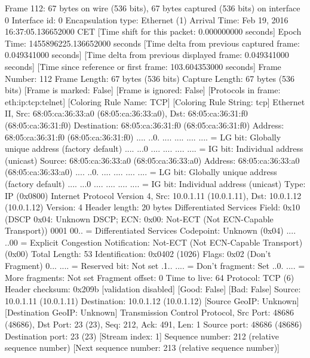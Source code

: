Frame 112: 67 bytes on wire (536 bits), 67 bytes captured (536 bits) on interface 0
    Interface id: 0
    Encapsulation type: Ethernet (1)
    Arrival Time: Feb 19, 2016 16:37:05.136652000 CET
    [Time shift for this packet: 0.000000000 seconds]
    Epoch Time: 1455896225.136652000 seconds
    [Time delta from previous captured frame: 0.049341000 seconds]
    [Time delta from previous displayed frame: 0.049341000 seconds]
    [Time since reference or first frame: 103.604353000 seconds]
    Frame Number: 112
    Frame Length: 67 bytes (536 bits)
    Capture Length: 67 bytes (536 bits)
    [Frame is marked: False]
    [Frame is ignored: False]
    [Protocols in frame: eth:ip:tcp:telnet]
    [Coloring Rule Name: TCP]
    [Coloring Rule String: tcp]
Ethernet II, Src: 68:05:ca:36:33:a0 (68:05:ca:36:33:a0), Dst: 68:05:ca:36:31:f0 (68:05:ca:36:31:f0)
    Destination: 68:05:ca:36:31:f0 (68:05:ca:36:31:f0)
        Address: 68:05:ca:36:31:f0 (68:05:ca:36:31:f0)
        .... ..0. .... .... .... .... = LG bit: Globally unique address (factory default)
        .... ...0 .... .... .... .... = IG bit: Individual address (unicast)
    Source: 68:05:ca:36:33:a0 (68:05:ca:36:33:a0)
        Address: 68:05:ca:36:33:a0 (68:05:ca:36:33:a0)
        .... ..0. .... .... .... .... = LG bit: Globally unique address (factory default)
        .... ...0 .... .... .... .... = IG bit: Individual address (unicast)
    Type: IP (0x0800)
Internet Protocol Version 4, Src: 10.0.1.11 (10.0.1.11), Dst: 10.0.1.12 (10.0.1.12)
    Version: 4
    Header length: 20 bytes
    Differentiated Services Field: 0x10 (DSCP 0x04: Unknown DSCP; ECN: 0x00: Not-ECT (Not ECN-Capable Transport))
        0001 00.. = Differentiated Services Codepoint: Unknown (0x04)
        .... ..00 = Explicit Congestion Notification: Not-ECT (Not ECN-Capable Transport) (0x00)
    Total Length: 53
    Identification: 0x0402 (1026)
    Flags: 0x02 (Don't Fragment)
        0... .... = Reserved bit: Not set
        .1.. .... = Don't fragment: Set
        ..0. .... = More fragments: Not set
    Fragment offset: 0
    Time to live: 64
    Protocol: TCP (6)
    Header checksum: 0x209b [validation disabled]
        [Good: False]
        [Bad: False]
    Source: 10.0.1.11 (10.0.1.11)
    Destination: 10.0.1.12 (10.0.1.12)
    [Source GeoIP: Unknown]
    [Destination GeoIP: Unknown]
Transmission Control Protocol, Src Port: 48686 (48686), Dst Port: 23 (23), Seq: 212, Ack: 491, Len: 1
    Source port: 48686 (48686)
    Destination port: 23 (23)
    [Stream index: 1]
    Sequence number: 212    (relative sequence number)
    [Next sequence number: 213    (relative sequence number)]
